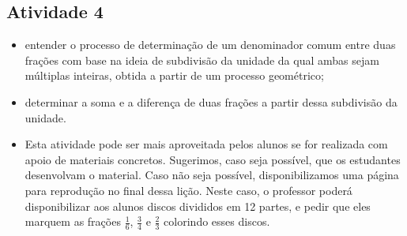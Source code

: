\begin{multicols}{2}
\subsection{Atividade 4}

\newline \vspace{.15cm}

\begin{itemize} %
  \item      entender o processo de determinação de um denominador comum entre duas frações com base na ideia de subdivisão da unidade da qual ambas sejam múltiplas inteiras, obtida a partir de um processo geométrico;  
  \item      determinar a soma e a diferença de duas frações a partir dessa subdivisão da unidade.
\end{itemize} %


 \vspace{.15cm}

\begin{itemize} %
  \item      Esta atividade pode ser mais aproveitada pelos alunos se for realizada com apoio de materiais concretos. Sugerimos, caso seja possível, que os estudantes desenvolvam o material. Caso não seja possível, disponibilizamos uma página para reprodução no final dessa lição. Neste caso, o professor poderá disponibilizar aos alunos discos divididos em 12 partes, e pedir que eles marquem as frações     $\frac{1}{6}$,     $\frac{3}{4}$     e     $\frac{2}{3}$     colorindo esses discos.



\end{itemize}
\end{multicols}
